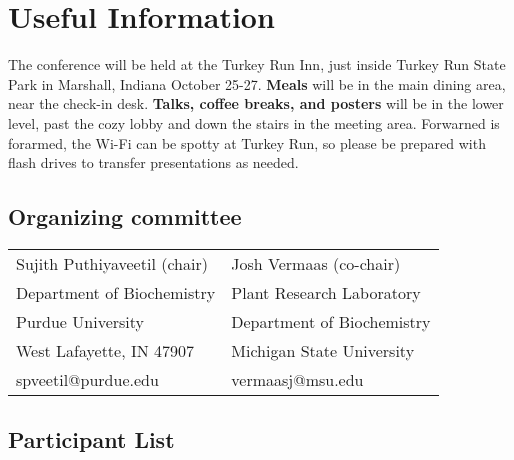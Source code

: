 \documentclass[
	openany, %
	parskip=full, %
	12pt, %
	letterpaper, %
]{conferencebooklet} %
\begin{document}


\chapter{Useful Information}

The conference will be held at the Turkey Run Inn, just inside Turkey Run State Park in Marshall, Indiana October 25-27.
\textbf{Meals} will be in the main dining area, near the check-in desk. 
\textbf{Talks, coffee breaks, and posters} will be in the lower level, past the cozy lobby and down the stairs in the meeting area.
Forwarned is forarmed, the Wi-Fi can be spotty at Turkey Run, so please be prepared with flash drives to transfer presentations as needed.

\section{Organizing committee}

\begin{center}
	\begin{tabular}{ll}
		Sujith Puthiyaveetil (chair)	&		Josh Vermaas (co-chair) \\
		Department of Biochemistry		&	Plant Research Laboratory \\
		Purdue University		&			Department of Biochemistry	\\
		West Lafayette, IN	47907	&			Michigan State University \\
		spveetil@purdue.edu       		&	vermaasj@msu.edu\\
		
	\end{tabular}
\end{center}

\section{Participant List}






\newpage

\thispagestyle{empty} %
\pagecolor{myblue} %
~

\end{document}
